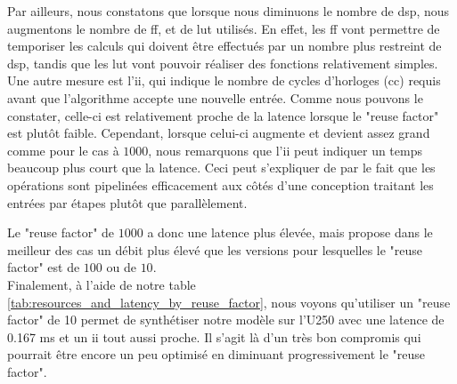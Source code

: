Par ailleurs, nous constatons que lorsque nous diminuons le nombre de \acrshort{dsp}, nous augmentons le nombre de \acrshort{ff}, et de \acrshort{lut} utilisés. En effet, les \acrshort{ff} vont permettre de temporiser les calculs qui doivent être effectués par un nombre plus restreint de \acrshort{dsp}, tandis que les \acrshort{lut} vont pouvoir réaliser des fonctions relativement simples.\\

Une autre mesure est l'\acrfull{ii}, qui indique le nombre de cycles d'horloges (\acrfull{cc}) requis avant que l'algorithme accepte une nouvelle entrée. Comme nous pouvons le constater, celle-ci est relativement proche de la latence lorsque le "reuse factor" est plutôt faible. Cependant, lorsque celui-ci augmente et devient assez grand comme pour le cas à $1000$, nous remarquons que l'\acrshort{ii} peut indiquer un temps beaucoup plus court que la latence. Ceci peut s'expliquer de par le fait que les opérations sont pipelinées efficacement aux côtés d'une conception traitant les entrées par étapes plutôt que parallèlement.

Le "reuse factor" de $1000$ a donc une latence plus élevée, mais propose dans le meilleur des cas un débit plus élevé que les versions pour lesquelles le "reuse factor" est de $100$ ou de $10$.\\

Finalement, à l'aide de notre table \ref{tab:resources_and_latency_by_reuse_factor}, nous voyons qu'utiliser un "reuse factor" de 10 permet de synthétiser notre modèle sur l'U250 avec une latence de 0.167 ms et un \acrshort{ii} tout aussi proche. Il s'agit là d'un très bon compromis qui pourrait être encore un peu optimisé en diminuant progressivement le "reuse factor".

